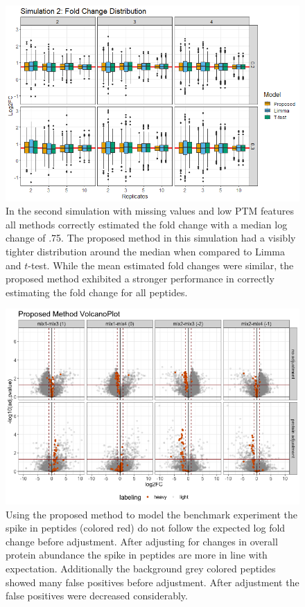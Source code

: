 \documentclass[mcp]{article}
\numberwithin{figure}{section} %
\numberwithin{table}{section}
\begin{document}
\begin{figure}[ht]
\centering
\includegraphics[width=1\textwidth]{images/sim3_FC_boxplot.png}
\caption{In the second simulation with missing values and low PTM features all methods correctly estimated the fold change with a median log change of .75. The proposed method in this simulation had a visibly tighter distribution around the median when compared to Limma and $t$-test. While the mean estimated fold changes were similar, the proposed method exhibited a stronger performance in correctly estimating the fold change for all peptides.}
\label{fig:sim_boxplot}
\end{figure}


\begin{figure}[ht]
\centering
\includegraphics[width=1\textwidth]{images/spike_in_msstatsptm_volcano.png}
\caption{Using the proposed method to model the benchmark experiment the spike in peptides (colored red) do not follow the expected log fold change before adjustment. After adjusting for changes in overall protein abundance the spike in peptides are more in line with expectation. Additionally the background grey colored peptides showed many false positives before adjustment. After adjustment the false positives were decreased considerably.
}\label{fig:spikein_prop_volcano}
\end{figure}
\end{document}

